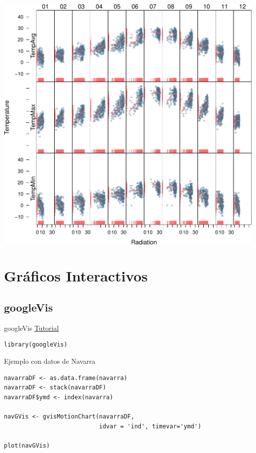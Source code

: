 \documentclass[xcolor={usenames,svgnames,dvipsnames}]{beamer}
\begin{document}
\begin{frame}[label=sec-4-2-4]{}
\includegraphics[width=.9\linewidth]{figs/aranjuezOuterStrips.pdf}
\end{frame}


\section{Gráficos Interactivos}
\label{sec-5}
\subsection{googleVis}
\label{sec-5-1}

\begin{frame}[fragile,label=sec-5-1-1]{googleVis}
 \href{http://decastillo.github.io/googleVis_Tutorial/}{Tutorial}

\lstset{language=R,label= ,caption= ,numbers=none}
\begin{lstlisting}
library(googleVis)
\end{lstlisting}
\end{frame}

\begin{frame}[fragile,label=sec-5-1-2]{Ejemplo con datos de Navarra}
 \lstset{language=R,label= ,caption= ,numbers=none}
\begin{lstlisting}
navarraDF <- as.data.frame(navarra)
navarraDF <- stack(navarraDF)
navarraDF$ymd <- index(navarra)

navGVis <- gvisMotionChart(navarraDF,
                           idvar = 'ind', timevar='ymd')

plot(navGVis)
\end{lstlisting}
\end{frame}
\end{document}
